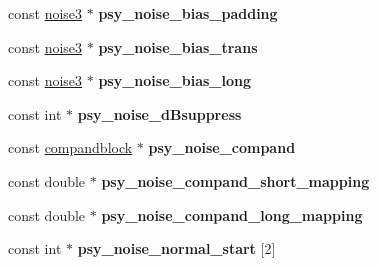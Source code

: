 \begin{DoxyCompactItemize}
\item 
\hypertarget{structve__setup__data__template_ad8f7e298cbc5991d0a477d62cc739596}{const \hyperlink{structnoise3}{noise3} $\ast$ {\bfseries psy\+\_\+noise\+\_\+bias\+\_\+padding}}\label{structve__setup__data__template_ad8f7e298cbc5991d0a477d62cc739596}

\item 
\hypertarget{structve__setup__data__template_a947c600433aa972329cb6df1e545f0ee}{const \hyperlink{structnoise3}{noise3} $\ast$ {\bfseries psy\+\_\+noise\+\_\+bias\+\_\+trans}}\label{structve__setup__data__template_a947c600433aa972329cb6df1e545f0ee}

\item 
\hypertarget{structve__setup__data__template_ad3afba81dd6940895281778e8506e4e8}{const \hyperlink{structnoise3}{noise3} $\ast$ {\bfseries psy\+\_\+noise\+\_\+bias\+\_\+long}}\label{structve__setup__data__template_ad3afba81dd6940895281778e8506e4e8}

\item 
\hypertarget{structve__setup__data__template_aa823dca2160d992c5d1f6afb78a4eaf1}{const int $\ast$ {\bfseries psy\+\_\+noise\+\_\+d\+Bsuppress}}\label{structve__setup__data__template_aa823dca2160d992c5d1f6afb78a4eaf1}

\item 
\hypertarget{structve__setup__data__template_a3ee279d169ec91f8706ad782a0adb2a0}{const \hyperlink{structcompandblock}{compandblock} $\ast$ {\bfseries psy\+\_\+noise\+\_\+compand}}\label{structve__setup__data__template_a3ee279d169ec91f8706ad782a0adb2a0}

\item 
\hypertarget{structve__setup__data__template_a072110b97ea5be01effaddb650a609c5}{const double $\ast$ {\bfseries psy\+\_\+noise\+\_\+compand\+\_\+short\+\_\+mapping}}\label{structve__setup__data__template_a072110b97ea5be01effaddb650a609c5}

\item 
\hypertarget{structve__setup__data__template_a4af20dd3d400ad5f70bef2344aa4d9d9}{const double $\ast$ {\bfseries psy\+\_\+noise\+\_\+compand\+\_\+long\+\_\+mapping}}\label{structve__setup__data__template_a4af20dd3d400ad5f70bef2344aa4d9d9}

\item 
\hypertarget{structve__setup__data__template_a47f4c1644c2a39cbfd8d812a43506afa}{const int $\ast$ {\bfseries psy\+\_\+noise\+\_\+normal\+\_\+start} \mbox{[}2\mbox{]}}\label{structve__setup__data__template_a47f4c1644c2a39cbfd8d812a43506afa}


\end{DoxyCompactItemize}
